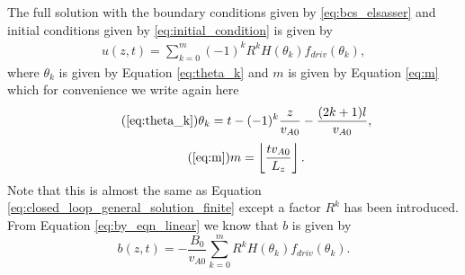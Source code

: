 The full solution with the boundary conditions given by \eqref{eq:bcs_elsasser} and initial conditions given by \eqref{eq:initial_condition} is given by
\begin{equation}
    \label{eq:leaky_loop_general_solution}
    \begin{aligned}
    u(z,t) = \sum_{k=0}^m(-1)^kR^kH(\theta_k)f_{driv}(\theta_k),
    \end{aligned}
\end{equation}
where $\theta_k$ is given by Equation \eqref{eq:theta_k} and $m$ is given by Equation \eqref{eq:m} which for convenience we write again here
\begin{equation}
    \tag{\ref{eq:theta_k}}
    \theta_k=t-(-1)^k\frac{z}{v_{A0}}-\frac{(2k+1)l}{v_{A0}},
\end{equation}
\begin{equation}
    \tag{\ref{eq:m}}
    m = \left\lfloor\frac{t v_{A0}}{L_z}\right\rfloor.
\end{equation}
Note that this is almost the same as Equation \eqref{eq:closed_loop_general_solution_finite} except a factor $R^k$ has been introduced. From Equation \eqref{eq:by_eqn_linear} we know that $b$ is given by
\begin{equation}
    b(z,t) = -\frac{B_0}{v_{A0}}\sum_{k=0}^mR^kH(\theta_k)f_{driv}(\theta_k).
\end{equation}

